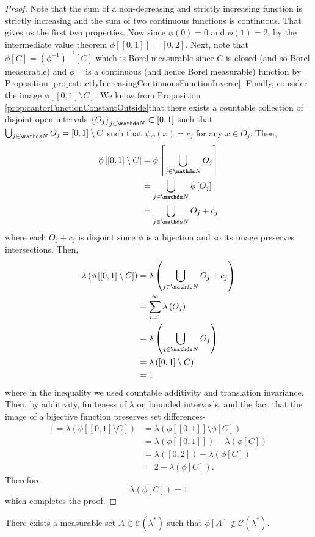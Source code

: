 \begin{proof}
Note that the sum of a non-decreasing and strictly increasing function
is strictly increasing and the sum of two continuous functions is
continuous. That gives us the first two properties. Now since $\phi\left(0\right)=0$
and $\phi\left(1\right)=2$, by the intermediate value theorem $\phi\left[\left[0,1\right]\right]=\left[0,2\right].$
Next, note that $\phi\left[C\right]=\left(\phi^{-1}\right)^{-1}\left[C\right]$
which is Borel measurable since $C$ is closed (and so Borel measurable)
and $\phi^{-1}$ is a continuous (and hence Borel measurable) function
by Proposition \ref{prop:strictlyIncreasingContinuousFunctionInverse}.
Finally, consider the image $\phi\left[\left[0,1\right]\setminus C\right]$.
We know from Proposition \ref{prop:cantorFunctionConstantOutside}that
there exists a countable collection of disjoint open intervals $\left\{ O_{j}\right\} _{j\in\N}\subset\left[0,1\right]$
such that $\bigcup_{j\in\N}O_{j}=\left[0,1\right]\setminus C$ such
that $\psi_{C}\left(x\right)=c_{j}$ for any $x\in O_{j}$. Then,
\begin{align*}
\phi\left[\left[0,1\right]\setminus C\right] & =\phi\left[\bigcup_{j\in\N}O_{j}\right]\\
 & =\bigcup_{j\in\N}\phi\left[O_{j}\right]\\
 & =\bigcup_{j\in\N}O_{j}+c_{j}
\end{align*}
where each $O_{j}+c_{j}$ is disjoint since $\phi$ is a bijection
and so its image preserves intersections. Then,
\begin{align*}
\lambda\left(\phi\left[\left[0,1\right]\setminus C\right]\right) & =\lambda\left(\bigcup_{j\in\N}O_{j}+c_{j}\right)\\
 & =\sum_{i=1}^{\infty}\lambda\left(O_{j}\right)\\
 & =\lambda\left(\bigcup_{j\in\N}O_{j}\right)\\
 & =\lambda\left(\left[0,1\right]\setminus C\right)\\
 & =1
\end{align*}
where in the inequality we used countable additivity and translation
invariance. Then, by additivity, finiteness of $\lambda$ on bounded
intervasls, and the fact that the image of a bijective function preserves
set differences-
\begin{align*}
1=\lambda\left(\phi\left[\left[0,1\right]\setminus C\right]\right) & =\lambda\left(\phi\left[\left[0,1\right]\right]\setminus\phi\left[C\right]\right)\\
 & =\lambda\left(\phi\left[\left[0,1\right]\right]\right)-\lambda\left(\phi\left[C\right]\right)\\
 & =\lambda\left(\left[0,2\right]\right)-\lambda\left(\phi\left[C\right]\right)\\
 & =2-\lambda\left(\phi\left[C\right]\right).
\end{align*}
Therefore 
\[
\lambda\left(\phi\left[C\right]\right)=1
\]
which completes the proof.
\end{proof}
\begin{thm}
\label{thm:continuousImageLebesgueMeasurable}There exists a measurable
set $A\in\mathcal{C}\left(\lambda^{*}\right)$ such that $\phi\left[A\right]\notin\mathcal{C}\left(\lambda^{*}\right).$
\end{thm}

